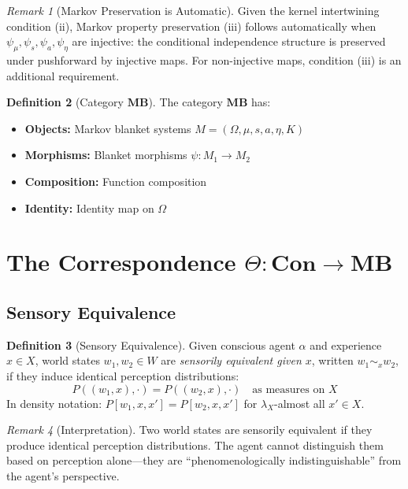 \documentclass[11pt,a4paper]{article}
\theoremstyle{definition}
\newtheorem{definition}{Definition}[section]
\theoremstyle{plain}
\theoremstyle{remark}
\newtheorem{remark}[definition]{Remark}
\newcommand{\Con}{\mathbf{Con}}
\newcommand{\MB}{\mathbf{MB}}
\begin{document}
\begin{remark}[Markov Preservation is Automatic]
Given the kernel intertwining condition (ii), Markov property preservation (iii) follows automatically when $\psi_\mu, \psi_s, \psi_a, \psi_\eta$ are injective: the conditional independence structure is preserved under pushforward by injective maps. For non-injective maps, condition (iii) is an additional requirement.
\end{remark}

\begin{definition}[Category $\MB$]
The category $\MB$ has:
\begin{itemize}
    \item \textbf{Objects:} Markov blanket systems $M = (\Omega, \mu, s, a, \eta, K)$
    \item \textbf{Morphisms:} Blanket morphisms $\psi: M_1 \to M_2$
    \item \textbf{Composition:} Function composition
    \item \textbf{Identity:} Identity map on $\Omega$
\end{itemize}
\end{definition}

\section{The Correspondence $\Theta: \Con \to \MB$}

\subsection{Sensory Equivalence}

\begin{definition}[Sensory Equivalence]\label{def:sensory-equiv}
Given conscious agent $\alpha$ and experience $x \in X$, world states $w_1, w_2 \in W$ are \emph{sensorily equivalent given $x$}, written $w_1 \sim_x w_2$, if they induce identical perception distributions:
\[
P((w_1, x), \cdot) = P((w_2, x), \cdot) \quad \text{as measures on } X
\]
In density notation: $P[w_1, x, x'] = P[w_2, x, x']$ for $\lambda_X$-almost all $x' \in X$.
\end{definition}

\begin{remark}[Interpretation]
Two world states are sensorily equivalent if they produce identical perception distributions. The agent cannot distinguish them based on perception alone---they are ``phenomenologically indistinguishable'' from the agent's perspective.
\end{remark}
\end{document}
